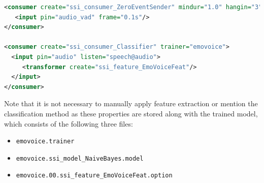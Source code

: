 \begin{lstlisting}[language=xml]
<consumer create="ssi_consumer_ZeroEventSender" mindur="1.0" hangin="3" hangout="3" sname="audio" ename="speech">
   <input pin="audio_vad" frame="0.1s"/>		  
</consumer>

<consumer create="ssi_consumer_Classifier" trainer="emovoice">
  <input pin="audio" listen="speech@audio">
     <transformer create="ssi_feature_EmoVoiceFeat"/>
  </input>
</consumer>
\end{lstlisting}

Note that it is not necessary to manually apply feature extraction or mention the classification method as these properties are stored along with the trained model, which consists of the following three files:
\begin{itemize}
\item \texttt{emovoice.trainer}
\item \texttt{emovoice.ssi\_model\_NaiveBayes.model}
\item \texttt{emovoice.00.ssi\_feature\_EmoVoiceFeat.option}
\end{itemize}
